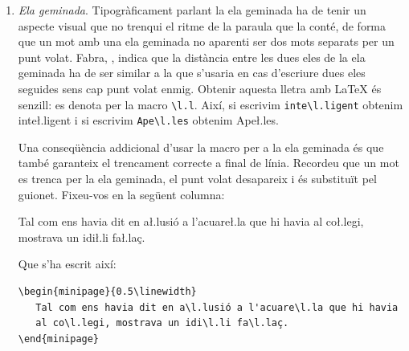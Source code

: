\documentclass{tfgitic}
\begin{document}
\begin{enumerate}
  El guió mitjà denota la resta o el canvi de signe.  \LaTeX{} el fa
  servir automàticament quan cal en les expressions matemàtiques.  Per
  exemple, si escrivim \verb|$-3$| obtenim $-3$.  Noteu com escriure
  \verb|$-3$| i \verb|-3| dóna resultats diferents: $-3$ i -3
  respectivament. La forma correcta és la primera! Pel que fa a la
  resta, si escriviu \verb|$3-x$| s'obté $3-x$, que és el que toca.

  Els guions llargs marquen els incisos o les intervencions en un
  diàleg ---en els documents científics majoritàriament es fan servir
  pel primer cas. S'escriuen amb tres guions seguits. Per exemple, la
  frase anterior s'ha escrit així: \verb|diàleg ---en els documents|

\item \emph{Ela geminada}. Tipogràficament parlant la ela geminada ha
  de tenir un aspecte visual que no trenqui el ritme de la paraula que
  la conté, de forma que un mot amb una ela geminada no aparenti ser
  dos mots separats per un punt volat. Fabra, \cite{fabra84:_conver},
  indica que la distància entre les dues eles de la ela geminada ha de
  ser similar a la que s'usaria en cas d'escriure dues eles seguides
  sens cap punt volat enmig. Obtenir aquesta lletra amb \LaTeX{} és
  senzill: es denota per la macro \verb!\l.l!. Així, si escrivim
  \verb!inte\l.ligent! obtenim inte\l.ligent i si escrivim
  \verb!Ape\l.les! obtenim Ape\l.les.

  Una conseqüència addicional d'usar la macro per a la ela geminada és
  que també garanteix el trencament correcte a final de
  línia. Recordeu que un mot es trenca per la ela geminada, el punt
  volat desapareix i és substituït pel guionet. Fixeu-vos en la
  següent columna:

  \begin{center}
    \begin{minipage}{0.5\linewidth}
      Tal com ens havia dit en a\l.lusió a l'acuare\l.la que hi havia
      al co\l.legi, mostrava un idi\l.li fa\l.laç.
    \end{minipage}
  \end{center}

  Que s'ha escrit així:

\begin{verbatim}
\begin{minipage}{0.5\linewidth}
   Tal com ens havia dit en a\l.lusió a l'acuare\l.la que hi havia
   al co\l.legi, mostrava un idi\l.li fa\l.laç.
\end{minipage}
\end{verbatim}


\end{enumerate}
\end{document}
